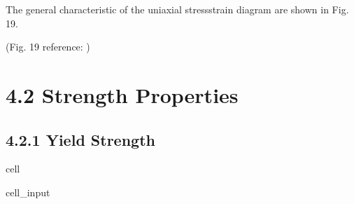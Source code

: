 \documentclass[letterpaper,10pt,english]{jupyterBook}
\begin{document}
	\sphinxAtStartPar
	The general characteristic of the uniaxial stress\sphinxhyphen{}strain diagram are shown in Fig. 19.
	
	
	
	\sphinxAtStartPar
	(Fig. 19 reference: )
	
	
	\section{4.2 Strength Properties}
	\label{\detokenize{4 Mechanical Properties:strength-properties}}
	
	\subsection{4.2.1 Yield Strength}
	\label{\detokenize{4 Mechanical Properties:yield-strength}}
	\begin{sphinxuseclass}{cell}\begin{sphinxVerbatimInput}
			
			\begin{sphinxuseclass}{cell_input}
				\begin{sphinxVerbatim}[commandchars=\\\{\}]
					  
					\PYG{p}{,}   \PYGZbs{}
					 \PYGZbs{}
					\PYG{p}{[}\PYG{p}{]}     
					

\end{sphinxVerbatim}
\end{sphinxuseclass}
\end{sphinxVerbatimInput}
\end{sphinxuseclass}
\end{document}
